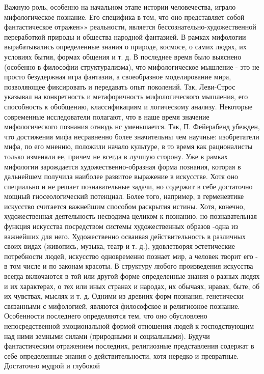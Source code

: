 \documentclass[12pt]{article}
\begin{document}
Важную  роль,  особенно  на  начальном  этапе  истории  человечества,  играло  мифологическое  познание.  Его
специфика в том, что оно представляет собой фантастическое отражен»» реальности, является бессознательно-художественной переработкой природы и общества народной фантазией. В рамках мифологии вырабатывались
определенные  знания  о природе,  космосе,  о самих  людях, их условиях бытия,  формах  общения и т. д.  В
последнее время было выяснено (особенно в философии структурализма), что мифологическое мышление - это
не  просто  безудержная  игра  фантазии,  а  своеобразное  моделирование  мира,  позволяющее  фиксировать  и
передавать опыт поколений. Так, Леви-Строс указывал на конкретность и метафоричность мифологического
мышления, его способность к обобщению, классификациям и логическому анализу.
Некоторые  современные  исследователи  полагают,  что  в  наше  время  значение  мифологического  познания
отнюдь нс уменьшается. Так, П. Фейерабенд убежден, что достижения мифа несравненно более значительны
чем научные: изобретатели мифа, по его мнению, положили начало культуре, в то время как рационалисты
только изменяли ее, причем не всегда в лучшую сторону.
Уже  в  рамках  мифологии  зарождается  художественно-образная  форма  познания,  которая  в  дальнейшем
получила наиболее развитое выражение в искусстве. Хотя оно специально и не решает познавательные задачи,
но содержит в себе достаточно мощный гносеологический потенциал. Более того, например, в герменевтике
искусство считается важнейшим способом раскрытия истины. Хотя, конечно, художественная деятельность
несводима целиком к познанию, но познавательная функция искусства посредством системы художественных
образов -одна из важнейших для него. Художественно осваивая действительность в различных своих видах
(живопись, музыка, театр и т. д.), удовлетворяя эстетические потребности людей, искусство одновременно
познает мир, а человек творит его - в том числе и по законам красоты. В структуру любого произведения
искусства всегда включаются в той или другой форме определенные знания о разных людях и их характерах, о
тех или иных странах и народах, их обычаях, нравах, быте, об их чувствах, мыслях и т. д.
Одними  из  древних  форм  познания,  генетически  связанными  с  мифологией,  являются  философское  и
религиозное познание. Особенности последнего определяются тем, что оно обусловлено непосредственной
эмоциональной  формой  отношения  людей  к  господствующим  над  ними  земными  силами  (природными  и
социальными). Будучи фантастическим отражением последних, религиозные представления содержат в себе
определенные  знания  о  действительности,  хотя  нередко  и  превратные.  Достаточно  мудрой  и  глубокой
\end{document}
